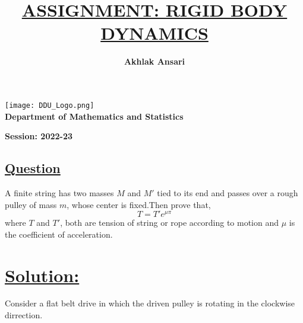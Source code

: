 \documentclass[12pt,a4paper]{article}
\title{{\bf \underline{ASSIGNMENT: RIGID BODY DYNAMICS}}}
\author{\bf Akhlak Ansari}
\begin{document}
    \maketitle

    \pagestyle{fancy}
    \fancyfoot{}
    \color{black}
    \rfoot{\thepage}
    \renewcommand{\footrulewidth}{1pt}

    \begin{center}
      
        \texttt{[image: DDU\_Logo.png]}\\[3mm]
        \textbf{ {\LARGE Department of Mathematics and Statistics}}
       
        \vspace{7.5cm}

        \textbf{Session: 2022-23}

    \end{center}
    
    \begin{center}
        \section*{\LARGE{\underline{Question}}}
    \end{center}

    A finite string has two masses $M$ and $M'$ tied to its end and passes over a rough pulley of mass $m$, whose center is fixed.Then prove that,
    \[T = T'e^{\mu \pi}\]
    where $T$ and $T'$, both are tension of string or rope according to motion and $\mu$ is the coefficient of acceleration.

    \vspace*{1cm}

  
    \section*{\LARGE{\underline{Solution:}}}
    
    \vspace*{0.5cm}

    \begin{center}
        \def\svgwidth{11cm}
        
    \end{center}

    Consider a flat belt drive in which the driven pulley is rotating in the clockwise dirrection.
    
\end{document}
